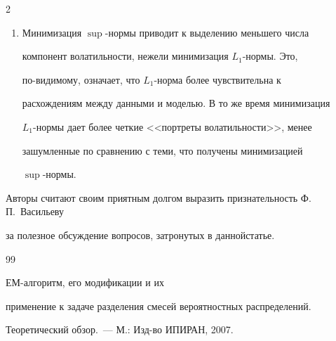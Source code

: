 \begin{multicols}{2}
\begin{enumerate}[1.]
$L_1$-нор\-мы.


\item


Минимизация $\sup$-нормы приводит к выделению меньшего числа


компонент волатильности, нежели минимизация $L_1$-нормы. Это,\linebreak


по-ви\-ди\-мо\-му, означает, что $L_1$-норма более чувствительна к


расхождениям между данными и моделью. В то же время минимизация


$L_1$-нормы дает более четкие <<портреты волатильности>>, менее


зашумленные по сравнению с теми, что получены минимизацией


$\sup$-нормы.


\end{enumerate}





\bigskip


Авторы считают своим приятным долгом выразить признательность Ф.\,П.~Васильеву


за полезное обсуждение вопросов, затронутых в данной\linebreak статье.










{\small\frenchspacing


{%




\begin{thebibliography}{99}









ЕМ-алгоритм, его модификации и их


применение к задаче разделения смесей вероятностных распределений.


Теоретический обзор.~--- М.: Изд-во ИПИРАН, 2007.










\end{thebibliography}}}
\end{multicols}
